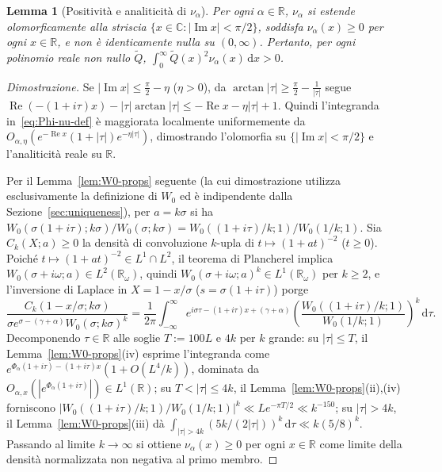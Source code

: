 \documentclass[11pt, reqno]{amsart}
\newtheorem{lemma}{Lemma}[section]
\theoremstyle{remark}
\numberwithin{equation}{section}
\DeclareMathOperator{\re}{Re}
\DeclareMathOperator{\im}{Im}
\newcommand{\R}{\mathbb{R}}
\newcommand{\C}{\mathbb{C}}
\newcommand{\dd}{\,\mathrm{d}}
\begin{document}
\begin{lemma}[Positività e analiticità di $\nu_\alpha$]\label{lem:nu-pos}
Per ogni $\alpha \in \R$, $\nu_\alpha$ si estende olomorficamente alla striscia
$\{x \in \C : |\im x| < \pi/2\}$, soddisfa $\nu_\alpha(x) \ge 0$ per ogni $x \in \R$, e non è
identicamente nulla su $(0,\infty)$. Pertanto, per ogni polinomio reale non nullo $\widetilde{Q}$,
$\int_0^\infty \widetilde{Q}(x)^2 \nu_\alpha(x)\dd x > 0$.
\end{lemma}

\begin{proof}[Dimostrazione]
Se $|\im x| \le \frac{\pi}{2} - \eta$ ($\eta > 0$), da $\arctan|\tau| \ge \frac{\pi}{2} - \frac{1}{|\tau|}$
segue $\re(-(1+i\tau)x) - |\tau|\arctan|\tau| \le -\re x - \eta|\tau| + 1$. Quindi l'integranda
in~\eqref{eq:Phi-nu-def} è maggiorata localmente uniformemente da $O_{\alpha,\eta}(e^{-\re x}(1+|\tau|)e^{-\eta|\tau|})$,
dimostrando l'olomorfia su $\{|\im x| < \pi/2\}$ e l'analiticità reale su $\R$.

Per il Lemma~\ref{lem:W0-props} seguente (la cui dimostrazione utilizza esclusivamente la definizione di
$W_0$ ed è indipendente dalla Sezione~\ref{sec:uniqueness}), per $a = k\sigma$ si ha
$W_0(\sigma(1+i\tau); k\sigma)/W_0(\sigma; k\sigma) = W_0((1+i\tau)/k; 1)/W_0(1/k; 1)$.
Sia $C_k(X; a) \ge 0$ la densità di convoluzione $k$-upla di $t \mapsto (1+at)^{-2}$ ($t \ge 0$).
Poiché $t \mapsto (1+at)^{-2} \in L^1 \cap L^2$, il teorema di Plancherel implica
$W_0(\sigma+i\omega; a) \in L^2(\R_\omega)$, quindi $W_0(\sigma+i\omega; a)^k \in L^1(\R_\omega)$
per $k \ge 2$, e l'inversione di Laplace in $X = 1 - x/\sigma$ ($s = \sigma(1+i\tau)$) porge
\[
\frac{C_k(1 - x/\sigma; k\sigma)}{\sigma e^{\sigma - (\gamma+\alpha)} W_0(\sigma; k\sigma)^k}
= \frac{1}{2\pi}\int_{-\infty}^\infty e^{i\sigma\tau - (1+i\tau)x + (\gamma+\alpha)}
\left(\frac{W_0((1+i\tau)/k; 1)}{W_0(1/k; 1)}\right)^{\!k}\dd\tau.
\]
Decomponendo $\tau \in \R$ alle soglie $T := 100 L$ e $4k$ per $k$ grande: su $|\tau| \le T$, il
Lemma~\ref{lem:W0-props}(iv) esprime l'integranda come
$e^{\Phi_\alpha(1+i\tau)-(1+i\tau)x}(1 + O(L^4/k))$, dominata da
$O_{\alpha,x}(|e^{\Phi_\alpha(1+i\tau)}|) \in L^1(\R)$; su $T < |\tau| \le 4k$, il
Lemma~\ref{lem:W0-props}(ii),(iv) forniscono $|W_0((1+i\tau)/k; 1)/W_0(1/k; 1)|^k \ll L e^{-\pi T/2} \ll k^{-150}$;
su $|\tau| > 4k$, il Lemma~\ref{lem:W0-props}(iii) dà $\int_{|\tau|>4k} (5k/(2|\tau|))^k \dd\tau \ll k(5/8)^k$.
Passando al limite $k \to \infty$ si ottiene $\nu_\alpha(x) \ge 0$ per ogni $x \in \R$ come limite
della densità normalizzata non negativa al primo membro.


\end{proof}
\end{document}
